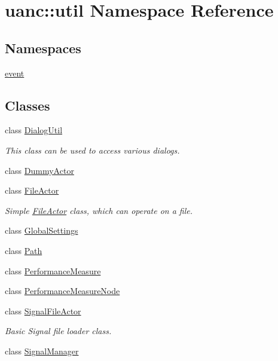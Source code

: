 \hypertarget{namespaceuanc_1_1util}{}\section{uanc\+:\+:util Namespace Reference}
\label{namespaceuanc_1_1util}
\subsection*{Namespaces}
\begin{DoxyCompactItemize}
\item 
 \hyperlink{namespaceuanc_1_1util_1_1event}{event}
\end{DoxyCompactItemize}
\subsection*{Classes}
\begin{DoxyCompactItemize}
\item 
class \hyperlink{classuanc_1_1util_1_1_dialog_util}{Dialog\+Util}
\begin{DoxyCompactList}\small\item\em This class can be used to access various dialogs. \end{DoxyCompactList}\item 
class \hyperlink{classuanc_1_1util_1_1_dummy_actor}{Dummy\+Actor}
\item 
class \hyperlink{classuanc_1_1util_1_1_file_actor}{File\+Actor}
\begin{DoxyCompactList}\small\item\em Simple \hyperlink{classuanc_1_1util_1_1_file_actor}{File\+Actor} class, which can operate on a file. \end{DoxyCompactList}\item 
class \hyperlink{classuanc_1_1util_1_1_global_settings}{Global\+Settings}
\item 
class \hyperlink{classuanc_1_1util_1_1_path}{Path}
\item 
class \hyperlink{classuanc_1_1util_1_1_performance_measure}{Performance\+Measure}
\item 
class \hyperlink{classuanc_1_1util_1_1_performance_measure_node}{Performance\+Measure\+Node}
\item 
class \hyperlink{classuanc_1_1util_1_1_signal_file_actor}{Signal\+File\+Actor}
\begin{DoxyCompactList}\small\item\em Basic Signal file loader class. \end{DoxyCompactList}\item 
class \hyperlink{classuanc_1_1util_1_1_signal_manager}{Signal\+Manager}
\end{DoxyCompactItemize}
